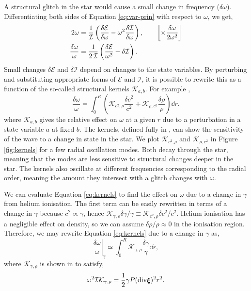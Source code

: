 A structural glitch in the star would cause a small change in frequency (\(\delta\omega\)). Differentiating both sides of Equation \ref{eq:var-prin} with respect to \(\omega\), we get,
%
\begin{align}
    2\omega &= \frac{1}{\mathcal{I}} \left( \frac{\delta\mathcal{E}}{\delta\omega} - \omega^2 \frac{\delta\mathcal{I}}{\delta\omega}\right), \qquad \left[\times \frac{\delta\omega}{2\omega^2}\right] \notag \\
    \frac{\delta\omega}{\omega} &= \frac{1}{2\,\mathcal{I}} \left(\frac{\delta\mathcal{E}}{\omega^2} - \delta\mathcal{I}\right).
\end{align}
%
Small changes \(\delta\mathcal{E}\) and \(\delta\mathcal{I}\) depend on changes to the state variables. By perturbing and substituting appropriate forms of \(\mathcal{E}\) and \(\mathcal{I}\), it is possible to rewrite this as a function of the so-called structural kernels \(\mathcal{K}_{a,b}\). For example \citep{Christensen-Dalsgaard2014},
%
\begin{equation}
    \frac{\delta\omega}{\omega} = \int_0^R \left(\mathcal{K}_{c^2,\rho} \frac{\delta c^2}{c^2} + \mathcal{K}_{\rho,c^2} \frac{\delta \rho}{\rho} \right) \dd r.\label{eq:kernels}
\end{equation}
%
where \(\mathcal{K}_{a, b}\) gives the relative effect on \(\omega\) at a given \(r\) due to a perturbation in a state variable \(a\) at fixed \(b\). The kernels, defined fully in \citet{Gough.Thompson1991}, can show the sensitivity of the wave to a change in state in the star. We plot \(\mathcal{K}_{c^2,\rho}\) and \(\mathcal{K}_{\rho,c^2}\) in Figure \ref{fig:kernels} for a few radial oscillation modes. Both decay through the star, meaning that the modes are less sensitive to structural changes deeper in the star. The kernels also oscillate at different frequencies corresponding to the radial order, meaning the amount they intersect with a glitch changes with \(\omega\).

We can evaluate Equation \ref{eq:kernels} to find the effect on \(\omega\) due to a change in \(\gamma\) from helium ionisation. The first term can be easily rewritten in terms of a change in \(\gamma\) because \(c^2 \propto \gamma\), hence \(\mathcal{K}_{\gamma,\rho} \delta \gamma / \gamma \equiv \mathcal{K}_{c^2,\rho} \delta c^2 / c^2\). Helium ionisation has a negligible effect on density, so we can assume \(\delta\rho/\rho \approx 0\) in the ionisation region. Therefore, we may rewrite Equation \ref{eq:kernels} due to a change in \(\gamma\) as,
%
\begin{equation}
    \left.\frac{\delta\omega}{\omega}\right|_\gamma \simeq \int_0^R \mathcal{K}_{\gamma,\rho} \frac{\delta\gamma}{\gamma} \dd r,\label{eq:delta-omega}
\end{equation}
%
where \(\mathcal{K}_{\gamma,\rho}\) is shown in \citet{Gough1993} to satisfy,
%
\begin{equation}
    \omega^2 \mathcal{I}\mathcal{K}_{\gamma,\rho} = \frac12 \gamma P (\mathrm{div} \bm{\xi})^2 r^2.\label{eq:gamma-kernel}
\end{equation}
%

